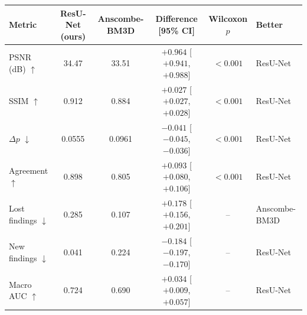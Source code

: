 \begin{tabular}{@{}lccccl@{}}
\toprule
\textbf{Metric} & \textbf{ResU-Net (ours)} & \textbf{Anscombe-BM3D} & \textbf{Difference [95\% CI]} & \textbf{Wilcoxon $p$} & \textbf{Better} \\
\midrule
PSNR (dB) $\uparrow$ & 34.47 & 33.51 & $+0.964$ [$+0.941$, $+0.988$] & $<0.001$ & ResU-Net \\
SSIM $\uparrow$ & 0.912 & 0.884 & $+0.027$ [$+0.027$, $+0.028$] & $<0.001$ & ResU-Net \\
$\Delta p$ $\downarrow$ & 0.0555 & 0.0961 & $-0.041$ [$-0.045$, $-0.036$] & $<0.001$ & ResU-Net \\
Agreement $\uparrow$ & 0.898 & 0.805 & $+0.093$ [$+0.080$, $+0.106$] & $<0.001$ & ResU-Net \\
Lost findings $\downarrow$ & 0.285 & 0.107 & $+0.178$ [$+0.156$, $+0.201$] & -- & Anscombe-BM3D \\
New findings $\downarrow$ & 0.041 & 0.224 & $-0.184$ [$-0.197$, $-0.170$] & -- & ResU-Net \\
Macro AUC $\uparrow$ & 0.724 & 0.690 & $+0.034$ [$+0.009$, $+0.057$] & -- & ResU-Net \\
\bottomrule
\end{tabular}
